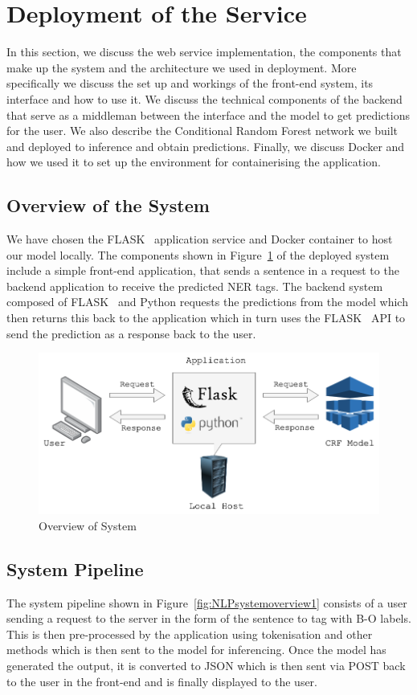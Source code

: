 \documentclass{surreydissertation}
\begin{document}
\section{Deployment of the Service}
In this section, we discuss the web service implementation, the components that make up the system and the architecture we used in deployment. More specifically we discuss the set up and workings of the front-end system, its interface and how to use it. We discuss the technical components of the backend that serve as a middleman between the interface and the model to get predictions for the user. We also describe the Conditional Random Forest network we built and deployed to inference and obtain predictions. Finally, we discuss Docker and how we used it to set up the environment for containerising the application.

\subsection{Overview of the System}
We have chosen the FLASK~\cite{flask} application service and Docker container to host our model locally. The components  shown in Figure~\ref{fig:NLPsystemoverview2} of the deployed system include a simple front-end application, that sends a sentence in a request to the backend application to receive the predicted NER tags. The backend system composed of FLASK~\cite{flask} and Python requests the predictions from the model which then returns this back to the application which in turn uses the FLASK~\cite{flask} API to send the prediction as a response back to the user.


\begin{figure}[H]
    \centering
    \includegraphics[width=0.9\linewidth]{Figures/NLPsystemoverview2.png}
    \caption{Overview of System}
    \label{fig:NLPsystemoverview2}
 \end{figure}

\subsection{System Pipeline}
The system pipeline shown in Figure~\ref{fig:NLPsystemoverview1} consists of a user sending a request to the server in the form of the sentence to tag with B-O labels. This is then pre-processed by the application using tokenisation and other methods which is then sent to the model for inferencing. Once the model has generated the output, it is converted to JSON which is then sent via POST back to the user in the front-end and is finally displayed to the user.
\end{document}
